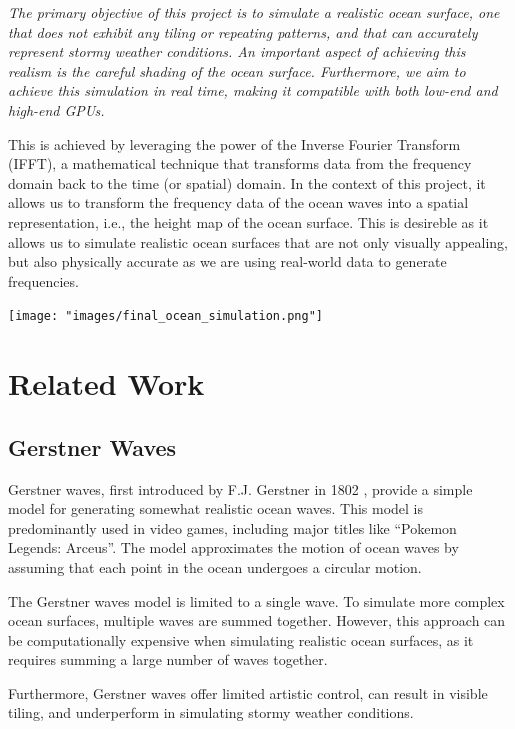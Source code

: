 \textit{The primary objective of this project is to simulate a realistic ocean surface, one that does not exhibit any tiling or repeating patterns, and that can accurately represent stormy weather conditions. An important aspect of achieving this realism is the careful shading of the ocean surface. Furthermore, we aim to achieve this simulation in real time, making it compatible with both low-end and high-end GPUs.}

This is achieved by leveraging the power of the Inverse Fourier Transform (IFFT), a mathematical technique that transforms data 
from the frequency domain back to the time (or spatial) domain. In the context of this project, 
it allows us to transform the frequency data of the ocean waves into a spatial representation, i.e., the height map of the ocean surface. This is
desireble as it allows us to simulate realistic ocean surfaces that are not only visually appealing, but also physically accurate as 
we are using real-world data to generate frequencies.

\begin{minipage}{1\textwidth}
    \centering
    \texttt{[image: "images/final\_ocean\_simulation.png"]}
    \label{fig:ocean_simulation}
\end{minipage}

\section{Related Work}

\subsection{Gerstner Waves}
Gerstner waves, first introduced by F.J. Gerstner in 1802 \cite{Franz1809}, provide a simple model for generating somewhat realistic ocean waves. This model is predominantly used in video games, including major titles like “Pokemon Legends: Arceus”. The model approximates the motion of ocean waves by assuming that each point in the ocean undergoes a circular motion. 

The Gerstner waves model is limited to a single wave. To simulate more complex ocean surfaces, multiple waves are summed together. However, this approach can be computationally expensive when simulating realistic ocean surfaces, as it requires summing a large number of waves together. 

Furthermore, Gerstner waves offer limited artistic control, can result in visible tiling, and underperform in simulating stormy weather conditions.

